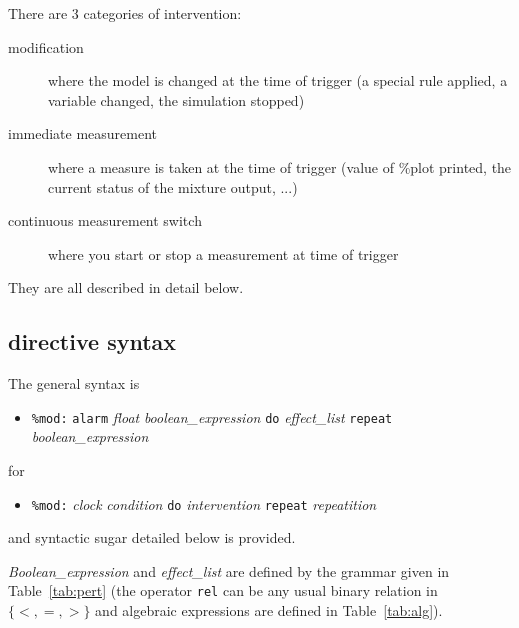 \documentclass[11pt]{book}
\def\ttt#1{\texttt{#1}}
\def\set#1{\{#1\}}
\def\ITE#1{\begin{itemize}#1\end{itemize}}
\begin{document}
There are 3 categories of intervention:
\begin{description}
\item[modification] where the model is changed at the time of trigger
  (a special rule applied, a variable changed, the simulation stopped)
\item[immediate measurement] where a measure is taken at the time of
  trigger (value of \%plot printed, the current status of the mixture
  output, ...)
\item[continuous measurement switch] where you start or stop a
  measurement at time of trigger
\end{description}
They are all described in detail below.

\subsection{directive syntax}
The general syntax is
\ITE{
\item[] \ttt{\%mod:} \ttt{alarm} \textit{float} \textit{boolean\_expression} \ttt{do} \textit{effect\_list} \ttt{repeat} \textit{boolean\_expression}
}
for
\ITE{
\item[] \ttt{\%mod:} \textit{clock} \textit{condition} \ttt{do} \textit{intervention} \ttt{repeat} \textit{repeatition}
}

and syntactic sugar detailed below is provided.

\textit{Boolean\_expression} and \textit{effect\_list} are defined by the grammar given in Table~\ref{tab:pert} (the operator \ttt{rel} can be any usual binary relation in $\set{<,=,>}$ and algebraic expressions are defined in Table~\ref{tab:alg}).
\end{document}
